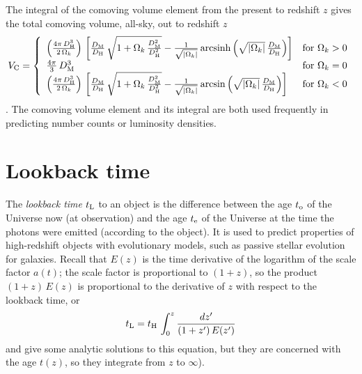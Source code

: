 The integral of the comoving volume element
from the present to redshift $z$ gives the total comoving volume,
all-sky, out to redshift $z$
\begin{equation}
V_{\rm C} = \left\{
\begin{array}{ll}
  \left(\frac{4\pi\,D_{\rm H}^3}{2\,\Omega_k}\right)\,
  \left[\frac{D_{\rm M}}{D_{\rm H}}\,
  \sqrt{1+\Omega_k\,\frac{D_{\rm M}^2}{D_{\rm H}^2}}
  -\frac{1}{\sqrt{|\Omega_k|}}\,
  {\rm arcsinh}\left(\sqrt{|\Omega_k|}\,\frac{D_{\rm M}}{D_{\rm H}}\right)\right]
  & {\rm for}~\Omega_k>0 \\
  \frac{4\pi}{3}\,D_{\rm M}^3
  & {\rm for}~\Omega_k=0 \\
  \left(\frac{4\pi\,D_{\rm H}^3}{2\,\Omega_k}\right)\,
  \left[\frac{D_{\rm M}}{D_{\rm H}}\,
  \sqrt{1+\Omega_k\,\frac{D_{\rm M}^2}{D_{\rm H}^2}}
  -\frac{1}{\sqrt{|\Omega_k|}}\,
  {\rm arcsin}\left(\sqrt{|\Omega_k|}\,\frac{D_{\rm M}}{D_{\rm H}}\right)\right]
  & {\rm for}~\Omega_k<0
\end{array}
\right.
\end{equation}
\citet{carroll_etal92}. The comoving volume element and its
integral are both used frequently in predicting number counts or
luminosity densities.

\section{Lookback time}

The {\it lookback time\/} $t_{\rm L}$ to an object is the difference
between the age $t_{\rm o}$ of the Universe now (at observation) and
the age $t_{\rm e}$ of the Universe at the time the photons were
emitted (according to the object).  It is used to predict properties
of high-redshift objects with evolutionary models, such as passive
stellar evolution for galaxies.  Recall that $E(z)$ is the time
derivative of the logarithm of the scale factor $a(t)$; the scale
factor is proportional to $(1+z)$, so the product $(1+z)\,E(z)$ is
proportional to the derivative of $z$ with respect to the lookback
time, or
\begin{equation}
t_{\rm L} = t_{\rm H}\,\int_0^z \frac{dz'}{(1+z')\,E(z')}
\end{equation}
\citet[e.g.,][pp 313-315]{peebles93} and \citet[][pp 52-56]{kolb_turner90} give some
analytic solutions to this equation, but they are concerned with the
age $t(z)$, so they integrate from $z$ to $\infty$). 


